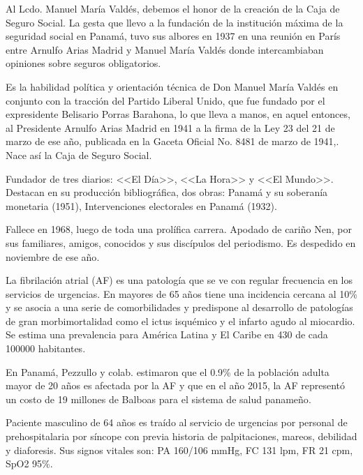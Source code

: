 \documentclass[a4paper]{article}
\let\cite=\supercite
\begin{document}
\begin{multicols}{3}
Al Lcdo. Manuel María Valdés, debemos el honor de la creación de la Caja de
Seguro Social. La gesta que llevo a la fundación de la institución máxima de
la seguridad social en Panamá, tuvo sus albores en 1937 en una reunión en
París entre Arnulfo Arias Madrid y Manuel María Valdés donde intercambiaban
opiniones sobre seguros obligatorios\cite{Pinock95}.

Es la habilidad política y orientación técnica de Don Manuel María Valdés en
conjunto con la tracción del Partido Liberal Unido, que fue fundado por el
expresidente Belisario Porras Barahona, lo que lleva a manos, en aquel entonces,
al Presidente Arnulfo Arias Madrid en 1941 a la firma de la Ley 23 del 21 de
marzo de ese año, publicada en la Gaceta Oficial No. 8481 de marzo de
1941\cite{Pinock95},\cite{gaceta1941}. Nace así la Caja de Seguro Social.

Fundador de tres diarios: <<El Día>>, <<La Hora>> y <<El Mundo>>. Destacan en
su producción bibliográfica, dos obras: Panamá y su soberanía monetaria (1951),
Intervenciones electorales en Panamá (1932)\cite{Leonard15}.

Fallece en 1968, luego de toda una prolífica carrera. Apodado de cariño Nen,
por sus familiares, amigos, conocidos y sus discípulos del periodismo. Es
despedido en noviembre de ese año\cite{Lot68}.

\closearticle



La fibrilación atrial (AF) es una patología que se ve con regular frecuencia
en los servicios de urgencias. En mayores de 65 años tiene una incidencia
cercana al 10\% y se asocia a una serie de comorbilidades y predispone al
desarrollo de patologías de gran morbimortalidad como el ictus isquémico y el
infarto agudo al miocardio. Se estima una prevalencia para América Latina y El
Caribe en 430 de cada 100000 habitantes\cite{brundel_atrial_2022}.

En Panamá, Pezzullo y colab. estimaron que el 0.9\% de la población adulta
mayor de 20 años es afectada por la AF y que en el año 2015, la AF representó
un costo de 19 millones de Balboas para el sistema de salud
panameño\cite{pezzullo2016}.

\begin{boxClinica}

Paciente masculino de 64 años es traído al servicio de urgencias por personal
de prehospitalaria por síncope con previa historia de palpitaciones, mareos,
debilidad y diaforesis. Sus signos vitales son: PA 160/106 mmHg, FC 131 lpm,
FR 21 cpm, SpO2 95\%.


\end{boxClinica}
\end{multicols}
\end{document}
